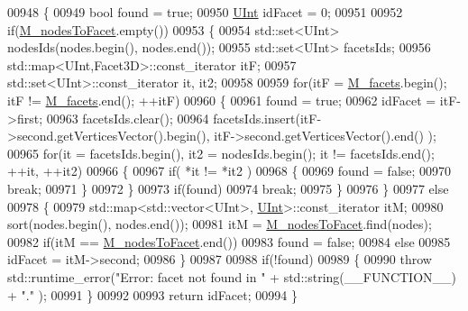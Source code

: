 \begin{DoxyCode}
00948 \{
00949     \textcolor{keywordtype}{bool} found = \textcolor{keyword}{true};
00950     \hyperlink{namespaceFVCode3D_a4bf7e328c75d0fd504050d040ebe9eda}{UInt} idFacet = 0;
00951 
00952     \textcolor{keywordflow}{if}(\hyperlink{classFVCode3D_1_1Mesh3D_add5bb503fb6d9bf6ee0656f02e712b06}{M\_nodesToFacet}.empty())
00953     \{
00954         std::set<UInt> nodesIds(nodes.begin(), nodes.end());
00955         std::set<UInt> facetsIds;
00956         std::map<UInt,Facet3D>::const\_iterator itF;
00957         std::set<UInt>::const\_iterator it, it2;
00958 
00959         \textcolor{keywordflow}{for}(itF = \hyperlink{classFVCode3D_1_1Mesh3D_a57d8b6af7f4385d749c2d83c235764de}{M\_facets}.begin(); itF != \hyperlink{classFVCode3D_1_1Mesh3D_a57d8b6af7f4385d749c2d83c235764de}{M\_facets}.end(); ++itF)
00960         \{
00961             found = \textcolor{keyword}{true};
00962             idFacet = itF->first;
00963             facetsIds.clear();
00964             facetsIds.insert(itF->second.getVerticesVector().begin(), itF->second.getVerticesVector().end()
      );
00965             \textcolor{keywordflow}{for}(it = facetsIds.begin(), it2 = nodesIds.begin(); it != facetsIds.end(); ++it, ++it2)
00966             \{
00967                 \textcolor{keywordflow}{if}( *it != *it2 )
00968                 \{
00969                     found = \textcolor{keyword}{false};
00970                     \textcolor{keywordflow}{break};
00971                 \}
00972             \}
00973             \textcolor{keywordflow}{if}(found)
00974                 \textcolor{keywordflow}{break};
00975         \}
00976     \}
00977     \textcolor{keywordflow}{else}
00978     \{
00979         std::map<std::vector<UInt>, \hyperlink{namespaceFVCode3D_a4bf7e328c75d0fd504050d040ebe9eda}{UInt}>::const\_iterator itM;
00980         sort(nodes.begin(), nodes.end());
00981         itM = \hyperlink{classFVCode3D_1_1Mesh3D_add5bb503fb6d9bf6ee0656f02e712b06}{M\_nodesToFacet}.find(nodes);
00982         \textcolor{keywordflow}{if}(itM == \hyperlink{classFVCode3D_1_1Mesh3D_add5bb503fb6d9bf6ee0656f02e712b06}{M\_nodesToFacet}.end())
00983             found = \textcolor{keyword}{false};
00984         \textcolor{keywordflow}{else}
00985             idFacet = itM->second;
00986     \}
00987 
00988     \textcolor{keywordflow}{if}(!found)
00989     \{
00990         \textcolor{keywordflow}{throw} std::runtime\_error(\textcolor{stringliteral}{"Error: facet not found in "} + std::string(\_\_FUNCTION\_\_) + \textcolor{stringliteral}{"."} );
00991     \}
00992 
00993     \textcolor{keywordflow}{return} idFacet;
00994 \}

\end{DoxyCode}

